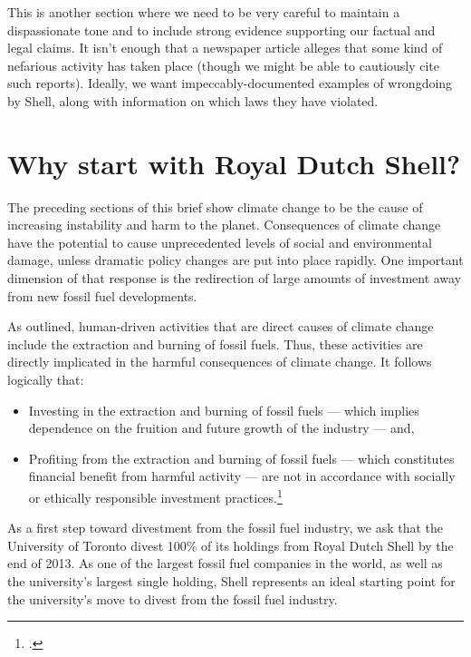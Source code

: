 
\begin{vcom}
	This is another section where we need to be very careful to maintain a dispassionate tone and to include strong evidence supporting our factual and legal claims. It isn't enough that a newspaper article alleges that some kind of nefarious activity has taken place (though we might be able to cautiously cite such reports). Ideally, we want impeccably-documented examples of wrongdoing by Shell, along with information on which laws they have violated.
\end{vcom}



		\section{Why start with Royal Dutch Shell?}



The preceding sections of this brief show climate change to be the cause of increasing instability and harm to the planet. 
Consequences of climate change have the potential to cause unprecedented levels of social and environmental damage, unless dramatic policy changes are put into place rapidly. 
One important dimension of that response is the redirection of large amounts of investment away from new fossil fuel developments.



As outlined, human-driven activities that are direct causes of climate change include the extraction and burning of fossil fuels. 
Thus, these activities are directly implicated in the harmful consequences of climate change. 
It follows logically that:
\begin{itemize}
	\item Investing in the extraction and burning of fossil fuels --- which implies dependence on the fruition and future growth of the industry --- and, 
	\item Profiting from the extraction and burning of fossil fuels --- which constitutes financial benefit from harmful activity --- are not in accordance with socially or ethically responsible investment practices.\footcite[][]{Richardson_2008}
\end{itemize}
As a first step toward divestment from the fossil fuel industry, we ask that the University of Toronto divest 100\% of its holdings from Royal Dutch Shell by the end of 2013. 
As one of the largest fossil fuel companies in the world, as well as the university's largest single holding, Shell represents an ideal starting point for the university's move to divest from the fossil fuel industry.
		
